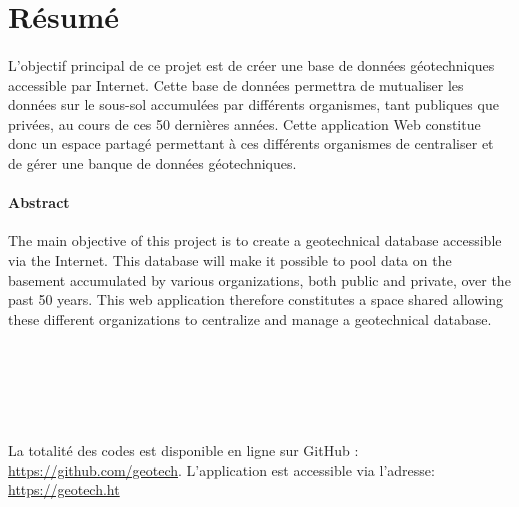 \section{Résumé}
\paragraph{}
L'objectif principal de ce projet est de créer une base de données géotechniques
 accessible par Internet. Cette base de données permettra de mutualiser les données 
 sur le sous-sol accumulées par différents organismes, tant publiques que privées, 
 au cours de ces 50 dernières années. Cette application Web constitue donc un espace 
 partagé permettant à ces différents organismes de centraliser et de gérer une banque 
 de données géotechniques.


\paragraph{Abstract}
The main objective of this project is to create a geotechnical database
 accessible via the Internet. This database will make it possible to pool data
 on the basement accumulated by various organizations, both public and private,
 over the past 50 years. This web application therefore constitutes a space
 shared allowing these different organizations to centralize and manage a
 geotechnical database.
\\
\\
\\
\\
\\
\\
\par
 {\small 
 La totalité des codes est disponible en ligne sur GitHub : \url{https://github.com/geotech}.
L’application est accessible via l’adresse: \url{https://geotech.ht}

 }